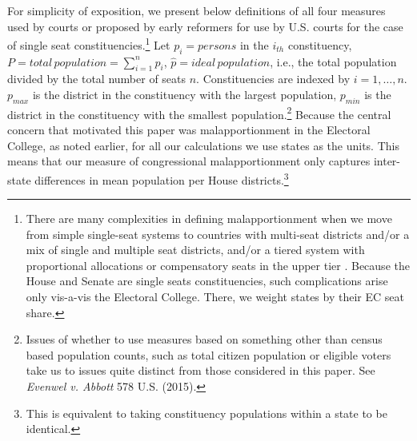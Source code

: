 For simplicity of exposition, we present below definitions of all four measures used by courts or proposed by early reformers for use by U.S. courts for the case of single seat constituencies.\footnote{There are many complexities in defining malapportionment when we move from simple single-seat systems to countries with multi-seat districts and/or a mix of single and multiple seat districts, and/or a tiered system with proportional allocations or compensatory seats in the upper tier \citep{SamuelsSnyder2001}. Because the House and Senate are single seats constituencies, such complications arise only vis-a-vis the Electoral College. There, we weight states by their EC seat share.} Let $p_i =persons $ in the $i_{th}$ constituency, $P =total \mspace{3mu} population =\sum_{i=1}^{n}{p_i}$, $ \hat{p} =ideal \mspace{3mu} population $, i.e., the total population divided by the total number of seats $n$. Constituencies are indexed by $ i =1,\dots,n $. $ p_{max} $ is the district in the constituency with the largest population, $ p_{min} $ is the district in the constituency with the smallest population.\footnote{Issues of whether to use measures based on something other than census based population counts, such as total citizen population or eligible voters take us to issues quite distinct from those considered in this paper. See \textit{Evenwel v. Abbott} 578 U.S. \underline{\quad} (2015).} Because the central concern that motivated this paper was malapportionment in the Electoral College, as noted earlier, for all our calculations we use states as the units. This means that our measure of congressional malapportionment only captures inter-state differences in mean population per House districts.\footnote{This is equivalent to taking constituency populations within a state to be identical.} 

%

